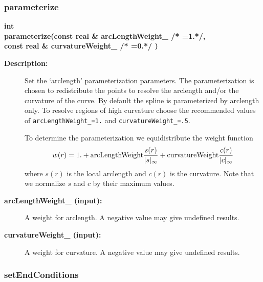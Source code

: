 \subsubsection{parameterize}
 
\begin{flushleft} \textbf{%
int  \\ 
\settowidth{\SplineMappingIncludeArgIndent}{parameterize(}%
parameterize(const real \& arcLengthWeight\_ /* =1.*/, \\ 
\hspace{\SplineMappingIncludeArgIndent}const real \& curvatureWeight\_ /* =0.*/ )
}\end{flushleft}
\begin{description}
\item[{\bf Description:}] 
   Set the `arclength' parameterization parameters. The parameterization is chosen to
 redistribute the points to resolve the arclength and/or the curvature of the curve.
 By default the spline is parameterized by arclength only. To resolve regions of high
 curvature choose the recommended values of {\tt arcLengthWeight\_=1.} and
  {\tt curvatureWeight\_=.5}.

  To determine the parameterization we equidistribute the weight function 
  \[
     w(r) = 1. + {\rm arcLengthWeight} {s(r)\over |s|_\infty}  
               + {\rm curvatureWeight} {c(r)\over |c|_\infty}
  \]
  where $s(r)$ is the local arclength and $c(r)$ is the curvature. Note that we normalize
 $s$ and $c$ by their maximum values.
  
\item[{\bf arcLengthWeight\_ (input):}]  A weight for arclength. A negative value may give undefined results.
\item[{\bf curvatureWeight\_ (input):}]  A weight for curvature. A negative value may give undefined results.
\end{description}
\subsubsection{setEndConditions}
 
